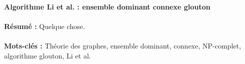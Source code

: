 \documentclass[a4paper,oneside,10pt]{article}
\begin{document}

\afterpage{\blankpage}

\newpage
\thispagestyle{empty}
\tableofcontents
\newpage
\vspace*{1cm}
\begin{center}\bfseries\Large
Algorithme Li et al. : ensemble dominant connexe glouton
\end{center}

\vspace*{1cm}
\paragraph{}
\textbf{Résumé :} Quelque chose.
\paragraph{}
\textbf{Mots-clés :} Théorie des graphes, ensemble dominant, connexe, NP-complet, algorithme glouton, Li et al.


\printindex
%
%
%
%
%
%
%
%
\end{document}
